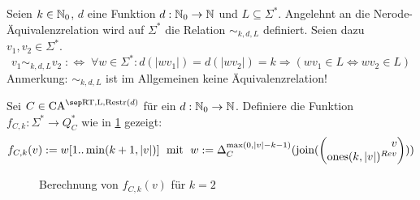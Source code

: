 \begin{definition}
    Seien $k \in \mathbb{N}_0$, $d$ eine Funktion $d: \mathbb{N}_0 \to \mathbb{N}$ und $L \subseteq \Sigma^*$.
    Angelehnt an die Nerode-Äquivalenzrelation wird auf $\Sigma^*$ die Relation $\sim_{k,d,L}$ definiert.
    Seien dazu $v_1, v_2 \in \Sigma^*$.
    \[
        v_1 \sim_{k,d,L} v_2 \; :\Leftrightarrow \; \forall w \in \Sigma^*: d(|wv_1|) = d(|wv_2|) = k \Rightarrow (wv_1 \in L \Leftrightarrow wv_2 \in L)
    \]
    Anmerkung: $\sim_{k,d,L}$ ist im Allgemeinen keine Äquivalenzrelation!
\end{definition}

\begin{definition}
    Sei $C \in \CAM{\CART, \CALeft, \CARestr(d)}$ für ein $d: \mathbb{N}_0 \to \mathbb{N}$. Definiere die Funktion $f_{C, k}: \Sigma^* \to Q_C^*$
    wie in \cref{fig:RestrAutomata_fCk} gezeigt:
    \[
        f_{C, k}(v) := w[1..\min(k+1, |v|)] \; \text{ mit } \; w := \Delta_C^{\max(0, |v|-k-1)}(  \comb(\Spvek{ v; \mathrm{ones}(k, |v|)^{Rev} })  )
    \]
    
    \begin{figure}[h!]
        \centering
        
        \caption{Berechnung von $f_{C,k}(v)$ für $k = 2$}
        \label{fig:RestrAutomata_fCk}
    \end{figure}
    
\end{definition}

